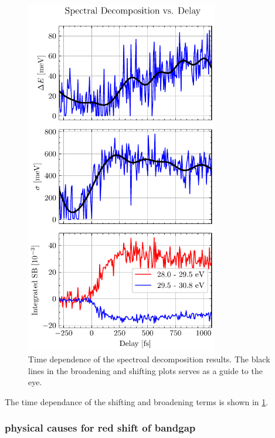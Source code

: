 \begin{figure}
	\centering
	\includegraphics[width=0.75\textwidth]{figures/chap4/OD_df_125Hz_Delay1-6_gaussian_shift_broad.pdf}
	\caption{Time dependence of the spectroal decomposition results. The black lines in the broadening and shifting plots serves as a guide to the eye.}
	\label{fig:OD_df_125Hz_Delay1-6_gaussian_shift_broad}
\end{figure}

The time dependance of the shifting and broadening terms is shown in \cref{fig:OD_df_125Hz_Delay1-6_gaussian_shift_broad}.


\subsubsection{physical causes for red shift of bandgap}


